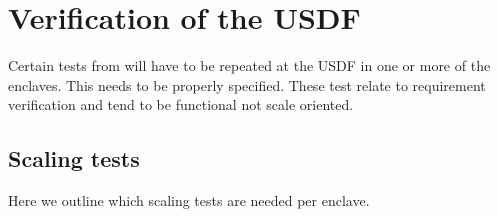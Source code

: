 \section{Verification of the USDF} \label{sec:verification}


Certain tests from  will have to be repeated at the USDF in one or more of the enclaves.
This needs to be properly specified. These test relate to requirement verification and tend to be functional not scale oriented.


\subsection{Scaling tests}
Here we outline which scaling tests are needed per enclave.

